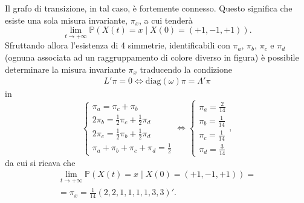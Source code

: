 \documentclass[11pt,largemargins]{homework}
\begin{document}
\begin{alphaparts}
\begin{itemize}
  Il grafo di transizione, in tal caso, è fortemente connesso. Questo significa che esiste una sola misura invariante, $\pi_{x}$, a cui tenderà $$\lim\limits_{t \rightarrow +\infty}\mathbb{P}\left(X\left(t\right)=x\mid X\left(0\right)=\left(+1,-1,+1\right)\right).$$
  Sfruttando allora l'esistenza di 4 simmetrie, identificabili con $\pi_{a}$, $\pi_{b}$, $\pi_{c}$ e $\pi_{d}$ (ognuna associata ad un raggruppamento di colore diverso in figura) è possibile determinare la misura invariante \(\pi_x\) traducendo la condizione 
  \begin{gather*}
    L'\pi = 0 \iff \text{diag}(\omega)\pi = \Lambda ' \pi
  \end{gather*}
  in
  \begin{equation*}
  \begin{cases}
    \pi_{a}=\pi_{c}+\pi_{b}\\
    2\pi_{b}=\frac{1}{2}\pi_c+ \frac{1}{2}\pi_d\\
    2\pi_{c}=\frac{1}{2}\pi_{b}+\frac{1}{2}\pi_{d}\\
    \pi_{a}+\pi_{b}+\pi_{c}+\pi_{d}=\frac{1}{2}
  \end{cases}
  \Leftrightarrow
  \begin{cases}
    \pi_{a}=\frac{2}{14}\\
    \pi_{b}=\frac{1}{14}\\
    \pi_{c}=\frac{1}{14}\\
    \pi_{d}=\frac{3}{14}
  \end{cases},
  \end{equation*}
  da cui si ricava che
  \begin{gather*}
  \lim\limits_{t \rightarrow +\infty}\mathbb{P}\left(X\left(t\right)=x\mid X\left(0\right)=\left(+1,-1,+1\right)\right)=\\
  =\pi_{x}=\frac{1}{14}\left(2, 2, 1, 1, 1, 1, 3, 3\right)'.
  \end{gather*}
  

\end{itemize}
\end{alphaparts}
\end{document}
